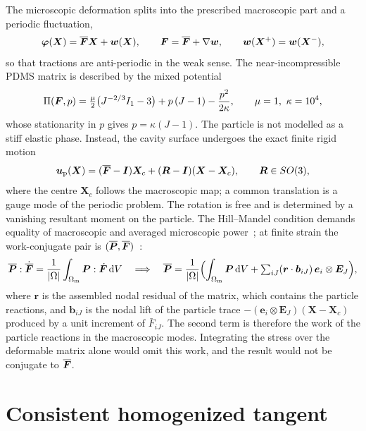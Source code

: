 The microscopic deformation splits into the prescribed
macroscopic part and a periodic fluctuation,
\begin{equation}
  \bm\varphi(\bm X)=\overline{\bm F}\bm X+\bm w(\bm X),\qquad
  \bm F=\overline{\bm F}+\nabla\bm w,\qquad \bm w(\bm X^+)=\bm w(\bm X^-),
  \label{eq:kin}
\end{equation}
so that tractions are anti-periodic in the weak sense. The near-incompressible
PDMS matrix is described by the mixed potential
\begin{equation}
  \Pi(\bm F,p)=\tfrac{\mu}{2}\bigl(J^{-2/3}I_1-3\bigr)+p\,(J-1)-\frac{p^2}{2\kappa},
  \qquad \mu=1,\ \kappa=10^4 ,
  \label{eq:mixed}
\end{equation}
whose stationarity in $p$ gives $p=\kappa(J-1)$. The particle is not modelled as
a stiff elastic phase. Instead, the cavity surface undergoes the exact finite
rigid motion
\begin{equation}
  \bm u_{\mathrm p}(\bm X)=(\overline{\bm F}-\bm I)\bm X_c+(\bm R-\bm I)(\bm X-\bm X_c),\qquad
  \bm R\in SO(3),
  \label{eq:rigid}
\end{equation}
where the centre $\bm X_c$ follows the macroscopic map; a common translation is a
gauge mode of the periodic problem. The rotation is free and is determined by a
vanishing resultant moment on the particle. The Hill--Mandel condition demands
equality of macroscopic and averaged microscopic power~\cite{Hill1963}; at finite
strain the work-conjugate pair is $(\overline{\bm P},\overline{\bm F})$~\cite{Hill1972}:
\begin{equation}
  \overline{\bm P}:\dot{\overline{\bm F}}=\frac{1}{|\Omega|}\int_{\Omega_{\mathrm m}}\bm P:\dot{\bm F}\,\mathrm d V
  \quad\Longrightarrow\quad
  \overline{\bm P}=\frac{1}{|\Omega|}\Bigl(\int_{\Omega_{\mathrm m}}\bm P\,\mathrm d V
  +\textstyle\sum_{iJ}(\bm r\cdot\bm b_{iJ})\,\bm e_i\otimes\bm E_J\Bigr),
  \label{eq:hm}
\end{equation}
where $\bm r$ is the assembled nodal residual of the matrix, which contains the
particle reactions, and $\bm b_{iJ}$ is the nodal lift of the particle trace
$-(\bm e_i\otimes\bm E_J)(\bm X-\bm X_c)$ produced by a unit increment of
$\bar F_{iJ}$. The second term is therefore the work of the particle reactions in
the macroscopic modes. Integrating the stress over the
deformable matrix alone would omit this work, and the result would not be
conjugate to $\overline{\bm F}$.

\section{Consistent homogenized tangent}

